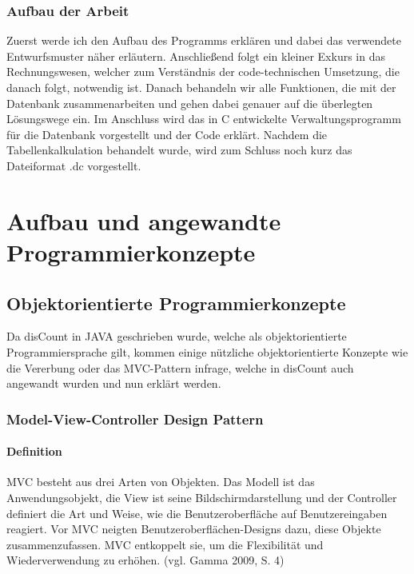 \documentclass[12pt]{report}
\begin{document}
\section{Aufbau der Arbeit}
Zuerst werde ich den Aufbau des Programms erklären und dabei das verwendete Entwurfsmuster näher erläutern. Anschließend folgt ein kleiner Exkurs in das Rechnungswesen, welcher zum Verständnis der code-technischen Umsetzung, die danach folgt, notwendig ist. Danach behandeln wir alle Funktionen, die mit der Datenbank zusammenarbeiten und gehen dabei genauer auf die überlegten Lösungswege ein. Im Anschluss wird das in C entwickelte Verwaltungsprogramm für die Datenbank vorgestellt und der Code erklärt. Nachdem die Tabellenkalkulation behandelt wurde, wird zum Schluss noch kurz das Dateiformat .dc vorgestellt.


\part{Aufbau und angewandte Programmierkonzepte}
 
\chapter{Objektorientierte Programmierkonzepte}
\lhead{\thepage}
  
Da disCount in JAVA geschrieben wurde, welche als objektorientierte Programmiersprache gilt, kommen einige nützliche objektorientierte Konzepte wie die Vererbung oder das MVC-Pattern infrage, welche in disCount auch angewandt wurden und nun erklärt werden.
  
  
\section{Model-View-Controller Design Pattern}
 
\subsection{Definition}
MVC besteht aus drei Arten von Objekten. Das Modell ist das Anwendungsobjekt, die View ist seine Bildschirmdarstellung und der Controller definiert die Art und Weise, wie die Benutzeroberfläche auf Benutzereingaben reagiert. Vor MVC neigten Benutzeroberflächen-Designs dazu, diese Objekte zusammenzufassen. MVC entkoppelt sie, um die Flexibilität und Wiederverwendung zu erhöhen. (vgl. Gamma 2009,  S. 4\nocite{DPGOF})\\
\end{document}
